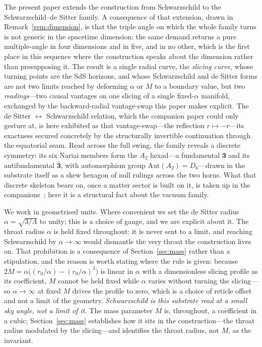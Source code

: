 \documentclass[11pt,a4paper]{article}
\theoremstyle{definition}
\begin{document}
The present paper extends the construction from Schwarzschild to the Schwarzschild--de Sitter family. A consequence of that extension, drawn in Remark~\ref{rem:dimension}, is that the triple angle on which the whole family turns is not generic in the spacetime dimension: the same demand returns a pure multiple-angle in four dimensions and in five, and in no other, which is the first place in this sequence where the construction speaks about the dimension rather than presupposing it. The result is a single radial curve, the \emph{slicing curve}, whose turning points are the SdS horizons, and whose Schwarzschild and de Sitter forms are not two limits reached by deforming $\alpha$ or $M$ to a boundary value, but two \emph{readings}---two causal vantages on one slicing of a single fixed-$\alpha$ manifold, exchanged by the backward-radial vantage-swap this paper makes explicit. The de Sitter $\leftrightarrow$ Schwarzschild relation, which the companion paper could only gesture at, is here exhibited as that vantage-swap---the reflection $r\mapsto-r$---its exactness secured concretely by the structurally invertible continuation through the equatorial seam. Read across the full swing, the family reveals a discrete symmetry: its six Nariai members form the $A_{2}$ hexad---a fundamental $\mathbf 3$ and its antifundamental $\bar{\mathbf 3}$, with automorphism group $\mathrm{Aut}(A_{2})=D_{6}$---drawn in the substrate itself as a skew hexagon of null rulings across the two horns. What that discrete skeleton bears on, once a matter sector is built on it, is taken up in the companions~\cite{JanzenMatter,JanzenBoundary}; here it is a structural fact about the vacuum family.

We work in geometrised units. Where convenient we set the de Sitter radius $\alpha=\sqrt{3/\Lambda}$ to unity; this is a choice of gauge, and we are explicit about it. The throat radius $\alpha$ is held fixed throughout: it is never sent to a limit, and reaching Schwarzschild by $\alpha\to\infty$ would dismantle the very throat the construction lives on. That prohibition is a consequence of Section~\ref{sec:mass} rather than a stipulation, and the reason is worth stating where the rule is given: because $2M=\alpha\bigl((r_{0}/\alpha)-(r_{0}/\alpha)^{3}\bigr)$ is linear in $\alpha$ with a dimensionless slicing profile as its coefficient, $M$ cannot be held fixed while $\alpha$ varies without turning the slicing---so $\alpha\to\infty$ at fixed $M$ drives the profile to zero, which is a choice of reticle offset and not a limit of the geometry. \emph{Schwarzschild is this substrate read at a small sky angle, not a limit of it.} The mass parameter $M$ is, throughout, a coefficient in a cubic; Section~\ref{sec:mass} establishes how it sits in the construction---the throat radius modulated by the slicing---and identifies the throat radius, not $M$, as the invariant.
\end{document}
